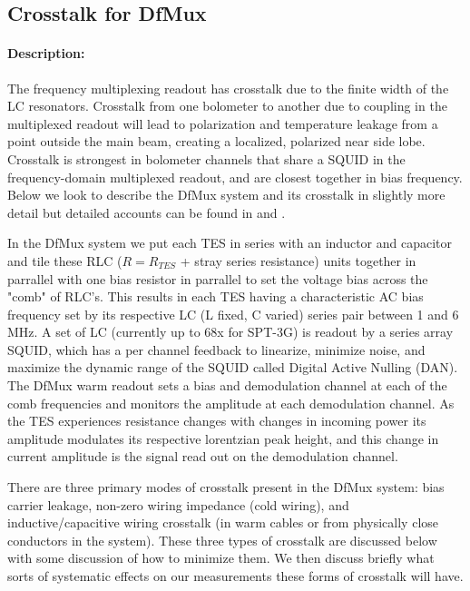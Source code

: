 \subsection{Crosstalk for DfMux}

\paragraph{Description:}
The frequency multiplexing readout has crosstalk due to the finite width of the LC resonators.
Crosstalk from one bolometer to another due to coupling in the multiplexed readout will lead to polarization and temperature leakage from a point outside the main beam, creating a localized, polarized near side lobe. Crosstalk is strongest in bolometer channels that share a SQUID in the frequency-domain multiplexed readout, and are closest together in bias frequency. Below we look to describe the DfMux system and its crosstalk in slightly more detail but detailed accounts can be found in \cite{Barron_Thesis} and \cite{DfMux_Dobbs2012}.

In the DfMux system we put each TES in series with an inductor and capacitor and tile these RLC ($R=R_{TES}$ + stray series resistance) units together in parrallel with one bias resistor in parrallel to set the voltage bias across the "comb" of RLC's. This results in each TES having a characteristic AC bias frequency set by its respective LC (L fixed, C varied) series pair between 1 and 6 MHz. A set of LC (currently up to 68x for SPT-3G\cite{SPT3G_DfMux_Overview}) is readout by a series array SQUID, which has a per channel feedback to linearize, minimize noise, and maximize the dynamic range of the SQUID called Digital Active Nulling (DAN)\cite{DfMux_LC_Production}. The DfMux warm readout sets a bias and demodulation channel at each of the comb frequencies and monitors the amplitude at each demodulation channel. As the TES experiences resistance changes with changes in incoming power its amplitude modulates its respective lorentzian peak height, and this change in current amplitude is the signal read out on the demodulation channel. 

There are three primary modes of crosstalk present in the DfMux system: bias carrier leakage, non-zero wiring impedance (cold wiring), and inductive/capacitive wiring crosstalk (in warm cables or from physically close conductors in the system). These three types of crosstalk are discussed below with some discussion of how to minimize them. \cite{DAN_Crosstalk_Memo} We then discuss briefly what sorts of systematic effects on our measurements these forms of crosstalk will have. 

